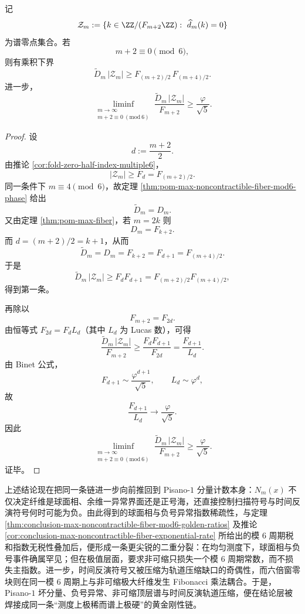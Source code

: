 \begin{theorem}\label{thm:conclusion-window6-spectral-topological-golden-product}
记
\[
\mathcal Z_m:=\{k\in \ZZ/(F_{m+2}\ZZ):\ \widehat d_m(k)=0\}
\]
为谱零点集合。若
\[
m+2\equiv 0\pmod 6,
\]
则有乘积下界
\[
\boxed{\;
\widetilde D_m\,|\mathcal Z_m|
\ge
F_{(m+2)/2}\,F_{(m+4)/2}.\;}
\]
进一步，
\[
\boxed{\;
\liminf_{\substack{m\to\infty\\ m+2\equiv 0\ (\mathrm{mod}\ 6)}}
\frac{\widetilde D_m\,|\mathcal Z_m|}{F_{m+2}}
\ge
\frac{\varphi}{\sqrt5}.\;}
\]
\end{theorem}
\begin{proof}
设
\[
d:=\frac{m+2}{2}.
\]
由推论 \ref{cor:fold-zero-half-index-multiple6}，
\[
|\mathcal Z_m|\ge F_d=F_{(m+2)/2}.
\]
同一条件下 \(m\equiv 4\pmod 6\)，故定理 \ref{thm:pom-max-noncontractible-fiber-mod6-phase} 给出
\[
\widetilde D_m=D_m.
\]
又由定理 \ref{thm:pom-max-fiber}，若 \(m=2k\) 则
\[
D_m=F_{k+2}.
\]
而 \(d=(m+2)/2=k+1\)，从而
\[
\widetilde D_m=D_m=F_{k+2}=F_{d+1}=F_{(m+4)/2}.
\]
于是
\[
\widetilde D_m\,|\mathcal Z_m|
\ge
F_dF_{d+1}
=
F_{(m+2)/2}F_{(m+4)/2},
\]
得到第一条。

再除以
\[
F_{m+2}=F_{2d}.
\]
由恒等式 \(F_{2d}=F_dL_d\)（其中 \(L_d\) 为 Lucas 数），可得
\[
\frac{\widetilde D_m\,|\mathcal Z_m|}{F_{m+2}}
\ge
\frac{F_dF_{d+1}}{F_{2d}}
=
\frac{F_{d+1}}{L_d}.
\]
由 Binet 公式，
\[
F_{d+1}\sim \frac{\varphi^{d+1}}{\sqrt5},
\qquad
L_d\sim \varphi^d,
\]
故
\[
\frac{F_{d+1}}{L_d}\longrightarrow \frac{\varphi}{\sqrt5}.
\]
因此
\[
\liminf_{\substack{m\to\infty\\ m+2\equiv 0\ (\mathrm{mod}\ 6)}}
\frac{\widetilde D_m\,|\mathcal Z_m|}{F_{m+2}}
\ge
\frac{\varphi}{\sqrt5}.
\]
证毕。
\end{proof}



上述结论现在把同一条链进一步向前推回到 Pisano-\(1\) 分量计数本身：\(N_m(x)\) 不仅决定纤维是球面相、余维一异常界面还是正号海，还直接控制扫描符号与时间反演符号何时可能为负。由此得到的球面相与负号异常指数稀疏性，与定理 \ref{thm:conclusion-max-noncontractible-fiber-mod6-golden-ratios} 及推论 \ref{cor:conclusion-max-noncontractible-fiber-exponential-rate} 所给出的模 \(6\) 周期税和指数无税性叠加后，便形成一条更尖锐的二重分裂：在均匀测度下，球面相与负号事件确属罕见；但在极值层面，要求非可缩只损失一个模 \(6\) 周期常数，而不损失主指数。进一步，时间反演符号又被压缩为轨道压缩缺口的奇偶性，而六倍窗零块则在同一模 \(6\) 周期上与非可缩极大纤维发生 Fibonacci 乘法耦合。于是，Pisano-\(1\) 坏分量、负号异常、非可缩顶层谱与时间反演轨道压缩，便在结论层被焊接成同一条“测度上极稀而谱上极硬”的黄金刚性链。

\endinput
